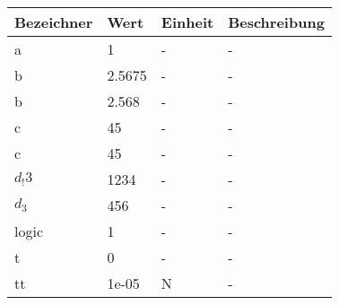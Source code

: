 \begin{longtable}{p{} p{} p{} p{}}
Bezeichner&	Wert&	Einheit&	Beschreibung\\\hline
a&	1&	-&	-\\\hline
b&	2.5675&	-&	-\\\hline
b&	2.568&	-&	-\\\hline
c&	45&	-&	-\\\hline
c&	45&	-&	-\\\hline
$d_!3$&	1234&	-&	-\\\hline
$d_3$&	456&	-&	-\\\hline
logic&	1&	-&	-\\\hline
t&	0&	-&	-\\\hline
tt&	1e-05&	N&	-\\\hline
\end{longtable}